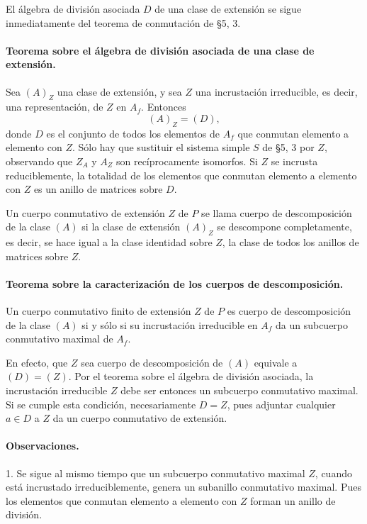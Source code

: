 El álgebra de división asociada \(D\) de una clase de extensión se sigue inmediatamente del teorema de conmutación de §5, 3.

\paragraph{Teorema sobre el álgebra de división asociada de una clase de extensión.}
Sea \((A)_Z\) una clase de extensión, y sea \(Z\) una incrustación irreducible, es decir, una representación, de \(Z\) en \(A_f\). Entonces
\[
        (A)_Z=(D),
\]
donde \(D\) es el conjunto de todos los elementos de \(A_f\) que conmutan elemento a elemento con \(Z\). Sólo hay que sustituir el sistema simple \(S\) de §5, 3 por \(Z\), observando que \(Z_A\) y \(A_Z\) son recíprocamente isomorfos. Si \(Z\) se incrusta reduciblemente, la totalidad de los elementos que conmutan elemento a elemento con \(Z\) es un anillo de matrices sobre \(D\).

Un cuerpo conmutativo de extensión \(Z\) de \(P\) se llama cuerpo de descomposición de la clase \((A)\) si la clase de extensión \((A)_Z\) se descompone completamente, es decir, se hace igual a la clase identidad sobre \(Z\), la clase de todos los anillos de matrices sobre \(Z\).

\paragraph{Teorema sobre la caracterización de los cuerpos de descomposición.}
Un cuerpo conmutativo finito de extensión \(Z\) de \(P\) es cuerpo de descomposición de la clase \((A)\) si y sólo si su incrustación irreducible en \(A_f\) da un subcuerpo conmutativo maximal de \(A_f\).

En efecto, que \(Z\) sea cuerpo de descomposición de \((A)\) equivale a \((D)=(Z)\). Por el teorema sobre el álgebra de división asociada, la incrustación irreducible \(Z\) debe ser entonces un subcuerpo conmutativo maximal. Si se cumple esta condición, necesariamente \(D=Z\), pues adjuntar cualquier \(a\in D\) a \(Z\) da un cuerpo conmutativo de extensión.

\paragraph{Observaciones.}
1. Se sigue al mismo tiempo que un subcuerpo conmutativo maximal \(Z\), cuando está incrustado irreduciblemente, genera un subanillo conmutativo maximal. Pues los elementos que conmutan elemento a elemento con \(Z\) forman un anillo de división.

